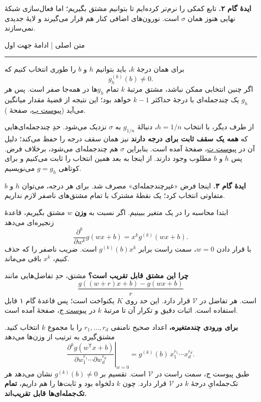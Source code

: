 \documentclass[12pt,a4paper]{article}
\newcommand{\V}{\mathcal V}
\newcommand{\heading}[1]{\par\Needspace{5\baselineskip}\vspace{5pt}{\large\bfseries #1\par}\nobreak\vspace{2pt}}
\newcommand{\ribbon}[1]{{\small #1\par}\vspace{-3pt}\hrule\vspace{8pt}}
\newcommand{\appref}[2]{\hyperref[#1]{پیوست #2}، صفحهٔ \pageref{#1}}
\begin{document}
\begin{intuition}
\textbf{ایدهٔ گام ۲.} تابع کمکی را نرم‌تر کرده‌ایم تا بتوانیم مشتق بگیریم؛ اما فعال‌سازی شبکهٔ نهایی هنوز همان $\sigma$ است. نورون‌های اضافی کنار هم قرار می‌گیرند و لایهٔ جدیدی نمی‌سازند.
\end{intuition}

\clearpage
{}\label{step:three}
\ribbon{متن اصلی | ادامهٔ جهت اول}
\heading{گام ۳. یک مشتق ناصفر پیدا می‌کنیم}
برای همان درجهٔ $k$، باید بتوانیم $h$ و $b$ را طوری انتخاب کنیم که
\[
g_h^{(k)}(b)\neq0.
\]
اگر چنین انتخابی ممکن نباشد، مشتق مرتبهٔ $k$ تمام $g_h$ها در همه‌جا صفر است. پس هر $g_h$ یک چندجمله‌ای با درجهٔ حداکثر $k-1$ خواهد بود؛ این نتیجه از قضیهٔ مقدار میانگین می‌آید (\appref{app:calculus}{پ}).

از طرف دیگر، با انتخاب $h=1/n$، دنبالهٔ $g_{1/n}$ به $\sigma$ نزدیک می‌شود. حدِ چندجمله‌ای‌هایی که \textbf{همه یک سقف ثابت برای درجه دارند} نیز همان سقف درجه را حفظ می‌کند؛ دلیل آن در \appref{app:lagrange}{ت} آمده است. بنابراین $\sigma$ هم چندجمله‌ای می‌شود، برخلاف فرض. پس $h$ و $b$ مطلوب وجود دارند. از اینجا به بعد همین انتخاب را ثابت می‌کنیم و برای کوتاهی $g=g_h$ می‌نویسیم.

\begin{intuition}
\textbf{ایدهٔ گام ۳.} اینجا فرض «غیرچندجمله‌ای» مصرف شد. برای هر درجه، می‌توان $h$ و $b$ متفاوتی انتخاب کرد؛ یک نقطهٔ مشترک با تمام مشتق‌های ناصفر لازم نداریم.
\end{intuition}

\label{step:four}
\heading{گام ۴. تک‌جمله‌ای‌ها را به دست می‌آوریم}
ابتدا محاسبه را در یک متغیر ببینیم. اگر نسبت به \textbf{وزن} $w$ مشتق بگیریم، قاعدهٔ زنجیره‌ای می‌دهد
\[
\frac{\partial^k}{\partial w^k}g(wx+b)=x^k g^{(k)}(wx+b).
\]
با قرار دادن $w=0$، سمت راست برابر $g^{(k)}(b)x^k$ است. ضریب ناصفر را که حذف کنیم، $x^k$ باقی می‌ماند.

\textbf{چرا این مشتق قابل تقریب است؟} مشتق، حدِ تفاضل‌هایی مانند
\[
\frac{g((w+r)x+b)-g(wx+b)}{r}
\]
است. هر تفاضل در $\V$ قرار دارد. این حد روی $K$ یکنواخت است؛ پس قاعدهٔ گام ۱ قابل استفاده است. اثبات دقیق و تکرار آن تا مرتبهٔ $k$ در \appref{app:derivative}{ج} آمده است.

\textbf{برای ورودی چندمتغیره،} اعداد صحیح نامنفی $r_1,\ldots,r_d$ را با مجموع $k$ انتخاب کنید. مشتق‌گیری به ترتیب از وزن‌ها می‌دهد
\[
\left.
\frac{\partial^k g(w^{\mathsf T}x+b)}
{\partial w_1^{r_1}\cdots\partial w_d^{r_d}}
\right|_{w=0}
=g^{(k)}(b)\,x_1^{r_1}\cdots x_d^{r_d}.
\]
طبق پیوست ج، سمت راست در $\V$ است. تقسیم بر $g^{(k)}(b)\neq0$ نشان می‌دهد هر تک‌جمله‌ایِ درجهٔ $k$ در $\V$ قرار دارد. چون $k$ دلخواه بود و ثابت‌ها را هم داریم، \textbf{تمام تک‌جمله‌ای‌ها قابل تقریب‌اند.}
\end{document}
